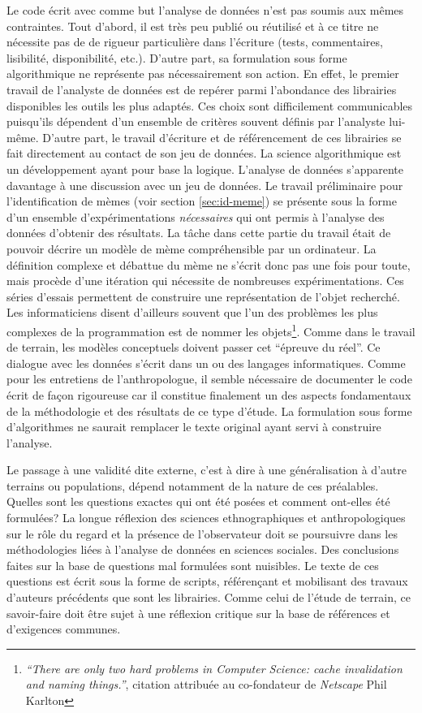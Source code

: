 Le code écrit avec comme but l'analyse de données n'est pas soumis aux mêmes contraintes. Tout d'abord, il est très peu publié ou réutilisé et à ce titre ne nécessite pas de de rigueur particulière dans l'écriture (tests, commentaires, lisibilité, disponibilité, etc.). D'autre part, sa formulation sous forme algorithmique ne représente pas nécessairement son action. En effet, le premier travail de l'analyste de données est de repérer parmi l'abondance des librairies disponibles les outils les plus adaptés. Ces choix sont difficilement communicables puisqu'ils dépendent d'un ensemble de critères souvent définis par l'analyste lui-même. D'autre part, le travail d'écriture et de référencement de ces librairies se fait directement au contact de son jeu de données. La science algorithmique est un développement ayant pour base la logique. L'analyse de données s'apparente davantage à une discussion avec un jeu de données. Le travail préliminaire pour l'identification de mèmes (voir section \ref{sec:id-meme}) se présente sous la forme d'un ensemble d'expérimentations \textit{nécessaires} qui ont permis à l'analyse des données d'obtenir des résultats. La tâche dans cette partie du travail était de pouvoir décrire un modèle de mème compréhensible par un ordinateur. La définition complexe et débattue du mème ne s'écrit donc pas une fois pour toute, mais procède d'une itération qui nécessite de nombreuses expérimentations. Ces séries d'essais permettent de construire une représentation de l'objet recherché. Les informaticiens disent d'ailleurs souvent que l'un des problèmes les plus complexes de la programmation est de nommer les objets\footnote{\textit{``There are only two hard problems in Computer Science: cache invalidation and naming things.''}, citation attribuée au co-fondateur de \textit{Netscape} Phil Karlton}. Comme dans le travail de terrain, les modèles conceptuels doivent passer cet ``épreuve du réel''. Ce dialogue avec les données s'écrit dans un ou des langages informatiques. Comme pour les entretiens de l'anthropologue, il semble nécessaire de documenter le code écrit de façon rigoureuse car il constitue finalement un des aspects fondamentaux de la méthodologie et des résultats de ce type d'étude. La formulation sous forme d'algorithmes ne saurait remplacer le texte original ayant servi à construire l'analyse.

Le passage à une validité dite externe, c'est à dire à une généralisation à d'autre terrains ou populations, dépend notamment de la nature de ces préalables. Quelles sont les questions exactes qui ont été posées et comment ont-elles été formulées? La longue réflexion des sciences ethnographiques et anthropologiques sur le rôle du regard et la présence de l'observateur doit se poursuivre dans les méthodologies liées à l'analyse de données en sciences sociales. Des conclusions faites sur la base de questions mal formulées sont nuisibles. Le texte de ces questions est écrit sous la forme de scripts, référençant et mobilisant des travaux d'auteurs précédents que sont les librairies. Comme celui de l'étude de terrain, ce savoir-faire doit être sujet à une réflexion critique sur la base de références et d'exigences communes.

